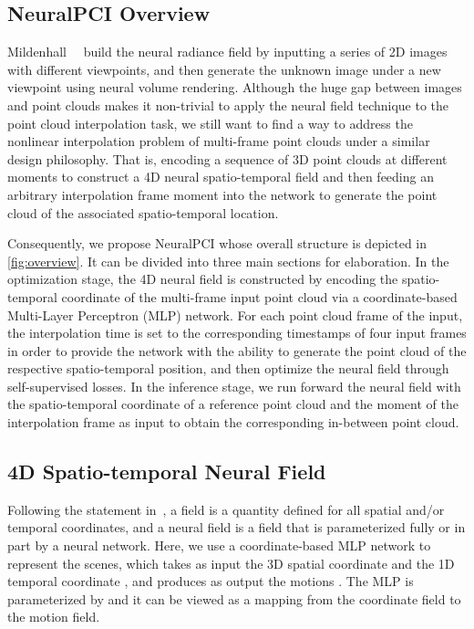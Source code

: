 \documentclass[10pt,twocolumn,letterpaper]{article}
\begin{document}
\subsection{NeuralPCI Overview}
\label{sec: overview}

Mildenhall~\etal~\cite{mildenhall2021nerf} build the neural radiance field by inputting a series of 2D images with different viewpoints, and then generate the unknown image under a new viewpoint using neural volume rendering. Although the huge gap between images and point clouds makes it non-trivial to apply the neural field technique to the point cloud interpolation task, we still want to find a way to address the nonlinear interpolation problem of multi-frame point clouds under a similar design philosophy. That is, encoding a sequence of 3D point clouds at different moments to construct a 4D neural spatio-temporal field and then feeding an arbitrary interpolation frame moment into the network to generate the point cloud of the associated spatio-temporal location. 

Consequently, we propose NeuralPCI whose overall structure is depicted in \cref{fig:overview}. It can be divided into three main sections for elaboration. In the optimization stage, the 4D neural field is constructed by encoding the spatio-temporal coordinate of the multi-frame input point cloud via a coordinate-based Multi-Layer Perceptron (MLP) network. For each point cloud frame of the input, the interpolation time is set to the corresponding timestamps of four input frames in order to provide the network with the ability to generate the point cloud of the respective spatio-temporal position, and then optimize the neural field through self-supervised losses. In the inference stage, we run forward the neural field with the spatio-temporal coordinate of a reference point cloud and the moment of the interpolation frame as input to obtain the corresponding in-between point cloud.


  
\subsection{4D Spatio-temporal Neural Field}
\label{sec: 4d spatio-temporal neural field}

Following the statement in~\cite{xie2022neural}, a field is a quantity defined for all spatial and/or temporal coordinates, and a neural field is a field that is parameterized fully or in part by a neural network.
Here, we use a coordinate-based MLP network to represent the scenes, which takes as input the 3D spatial coordinate  and the 1D temporal coordinate , and produces as output the motions . The MLP is parameterized by  and it can be viewed as a mapping from the coordinate field to the motion field.
\end{document}
